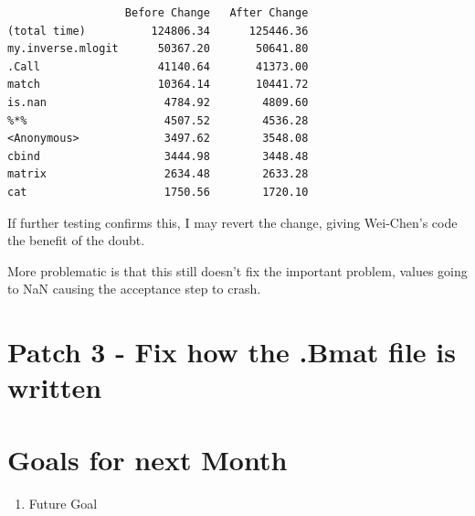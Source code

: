 \begin{verbatim}
                  Before Change   After Change
(total time)          124806.34      125446.36
my.inverse.mlogit      50367.20       50641.80
.Call                  41140.64       41373.00
match                  10364.14       10441.72
is.nan                  4784.92        4809.60
%*%                     4507.52        4536.28
<Anonymous>             3497.62        3548.08
cbind                   3444.98        3448.48
matrix                  2634.48        2633.28
cat                     1750.56        1720.10
\end{verbatim}

If further testing confirms this, I may revert the change, giving Wei-Chen's code the benefit of the doubt.

More problematic is that this still doesn't fix the important problem, values going to NaN causing the acceptance step to crash.


\section{Patch 3 - Fix how the .Bmat file is written}




\section{Goals for next Month}
\begin{enumerate}
\item Future Goal
\end{enumerate}


